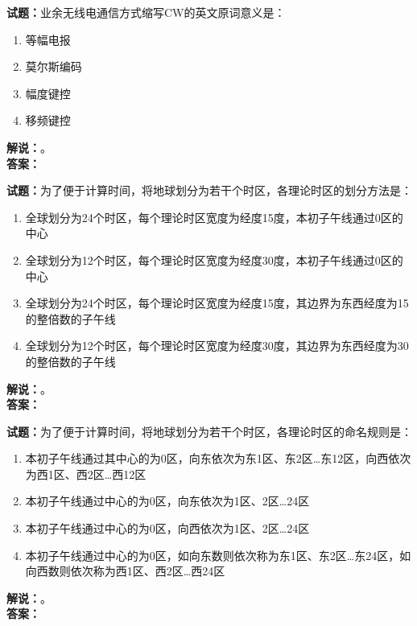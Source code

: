 \documentclass{ctexbook}
\begin{document}
\vspace{\baselineskip}

\noindent\textbf{试题：}业余无线电通信方式缩写CW的英文原词意义是：
\begin{enumerate}[leftmargin=3em]
  \item 等幅电报
  \item 莫尔斯编码
  \item 幅度键控
  \item 移频键控
\end{enumerate}
\noindent\textbf{解说：}\textbf{}。\\\noindent\textbf{答案：}

\vspace{\baselineskip}

\noindent\textbf{试题：}为了便于计算时间，将地球划分为若干个时区，各理论时区的划分方法是：
\begin{enumerate}[leftmargin=3em]
  \item 全球划分为24个时区，每个理论时区宽度为经度15度，本初子午线通过0区的中心
  \item 全球划分为12个时区，每个理论时区宽度为经度30度，本初子午线通过0区的中心
  \item 全球划分为24个时区，每个理论时区宽度为经度15度，其边界为东西经度为15的整倍数的子午线
  \item 全球划分为12个时区，每个理论时区宽度为经度30度，其边界为东西经度为30的整倍数的子午线
\end{enumerate}
\noindent\textbf{解说：}\textbf{}。\\\noindent\textbf{答案：}

\vspace{\baselineskip}

\noindent\textbf{试题：}为了便于计算时间，将地球划分为若干个时区，各理论时区的命名规则是：
\begin{enumerate}[leftmargin=3em]
  \item 本初子午线通过其中心的为0区，向东依次为东1区、东2区…东12区，向西依次为西1区、西2区…西12区
  \item 本初子午线通过中心的为0区，向东依次为1区、2区…24区
  \item 本初子午线通过中心的为0区，向西依次为1区、2区…24区
  \item 本初子午线通过中心的为0区，如向东数则依次称为东1区、东2区…东24区，如向西数则依次称为西1区、西2区…西24区
\end{enumerate}
\noindent\textbf{解说：}\textbf{}。\\\noindent\textbf{答案：}
\end{document}
